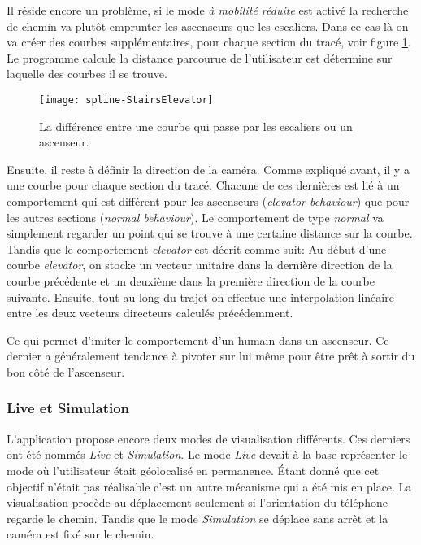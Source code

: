 Il réside encore un problème, si le mode \textit{à mobilité réduite} est activé la recherche de chemin va plutôt emprunter les ascenseurs que les escaliers. Dans ce cas là on va créer des courbes supplémentaires, pour chaque section du tracé, voir figure \ref{fig:spline-stairselevator}. Le programme calcule la distance parcourue de l'utilisateur est détermine sur laquelle des courbes il se trouve.

\begin{figure}
	\centering
	\texttt{[image: spline-StairsElevator]}
	\caption{La différence entre une courbe qui passe par les escaliers ou un ascenseur.}
	\label{fig:spline-stairselevator}
\end{figure}

Ensuite, il reste à définir la direction de la caméra. Comme expliqué avant, il y a une courbe pour chaque section du tracé. Chacune de ces dernières est lié à un comportement qui est différent pour les ascenseurs (\textit{elevator behaviour}) que pour les autres sections (\textit{normal behaviour}). Le comportement de type \emph{normal} va simplement regarder un point qui se trouve à une certaine distance sur la courbe. Tandis que le comportement \emph{elevator} est décrit comme suit: 
Au début d'une courbe \emph{elevator}, on stocke un vecteur unitaire dans la dernière direction de la courbe précédente et un deuxième dans la première direction de la courbe suivante. Ensuite, tout au long du trajet on effectue une interpolation linéaire entre les deux vecteurs directeurs calculés précédemment.

Ce qui permet d'imiter le comportement d'un humain dans un ascenseur. Ce dernier a généralement tendance à pivoter sur lui même pour être prêt à sortir du bon côté de l'ascenseur.

\subsubsection{Live et Simulation}
L'application propose encore deux modes de visualisation différents. Ces derniers ont été nommés \emph{Live} et \emph{Simulation}. Le mode \emph{Live} devait à la base représenter le mode où l'utilisateur était géolocalisé en permanence. Étant donné que cet objectif n'était pas réalisable c'est un autre mécanisme qui a été mis en place. La visualisation procède au déplacement seulement si l'orientation du téléphone regarde le chemin. Tandis que le mode \emph{Simulation} se déplace sans arrêt et la caméra est fixé sur le chemin.
